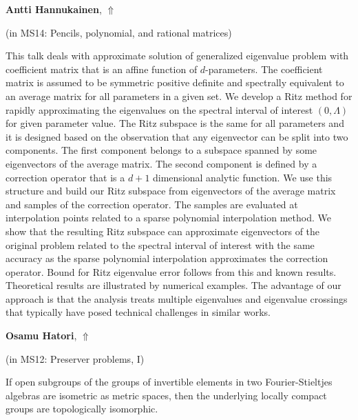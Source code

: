 \documentclass[ILAS2025-program.tex]{subfiles}
\begin{document}
     \hypertarget{down0329}{}\begin{ilasabstract}
    
    \textbf{Antti Hannukainen},  \hfill \hyperlink{up0329}{$\Uparrow$}
    
    (in {\color{mstitle}MS14: Pencils, polynomial, and rational matrices})
        
        \mtskip
    This talk deals with approximate solution of generalized eigenvalue problem with coefficient matrix that is an affine function of $d$-parameters. The coefficient matrix is assumed to be symmetric positive definite and spectrally equivalent to an average matrix for all parameters in a given set. We develop a Ritz method for rapidly approximating the eigenvalues on the spectral interval of interest $(0,\Lambda)$ for given parameter value. The Ritz subspace is the same for all parameters and it is designed based on the observation that any eigenvector can be split into two components. The first component belongs to a subspace spanned by some eigenvectors of the average matrix. The second component is defined by a correction operator that is a $d+1$ dimensional analytic function. We use this structure and build our Ritz subspace from eigenvectors of the average matrix and samples of the correction operator. The samples are evaluated at interpolation points related to a sparse polynomial interpolation method. We show that the resulting Ritz subspace can approximate eigenvectors of the original problem related to the spectral interval of interest with the same accuracy as the sparse polynomial interpolation approximates the correction operator. Bound for Ritz eigenvalue error follows from this and known results. Theoretical results are illustrated by numerical examples. The advantage of our approach is that the analysis treats multiple eigenvalues and eigenvalue crossings that typically have posed technical challenges in similar works.
\end{ilasabstract}
     \hypertarget{down0128}{}\begin{ilasabstract}
    
    \textbf{Osamu Hatori},  \hfill \hyperlink{up0128}{$\Uparrow$}
    
    (in {\color{mstitle}MS12: Preserver problems, I})
        
        \mtskip
    If open subgroups of the groups of invertible elements in two Fourier-Stieltjes algebras are isometric as metric spaces, then the underlying locally compact groups are topologically isomorphic.
\end{ilasabstract}
\end{document}
